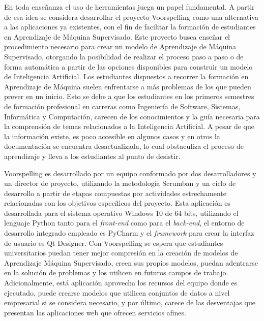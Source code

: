 En toda enseñanza el uso de herramientas juega un papel fundamental. A partir de esa idea se considera desarrollar el proyecto Voorspelling como una alternativa a las aplicaciones ya existentes, con el fin de facilitar la formación de estudiantes en Aprendizaje de Máquina Supervisado. Este proyecto busca enseñar el procedimiento necesario para crear un modelo de Aprendizaje de Máquina Supervisado, otorgando la posibilidad de realizar el proceso paso a paso o de forma automática a partir de las opciones disponibles para construir un modelo de Inteligencia Artificial. Los estudiantes dispuestos a recorrer la formación en Aprendizaje de Máquina suelen enfrentarse a más problemas de los que pueden prever en un inicio. Esto se debe a que los estudiantes en los primeros semestres de formación profesional en carreras como Ingeniería de Software, Sistemas, Informática y Computación, carecen de los conocimientos y la guía necesaria para la comprensión de temas relacionados a la Inteligencia Artificial. A pesar de que la información existe, es poco accesible en algunos casos y en otros la documentación se encuentra desactualizada, lo cual obstaculiza el proceso de aprendizaje y lleva a los estudiantes al punto de desistir.

Voorspelling es desarrollado por un equipo conformado por dos desarrolladores y un director de proyecto, utilizando la metodología Scrumban y un ciclo de desarrollo a partir de etapas compuestas por actividades estrechamente relacionadas con los objetivos específicos del proyecto. Esta aplicación es desarrollada para el sistema operativo Windows 10 de 64 bits, utilizando el lenguaje Python tanto para el \textit{front-end} como para el \textit{back-end}, el entorno de desarrollo integrado empleado es PyCharm y el \textit{framework} para crear la interfaz de usuario es Qt Designer. Con Voorspelling se espera que estudiantes universitarios puedan tener mejor compresión en la creación de modelos de Aprendizaje Máquina Supervisado, creen sus propios modelos, puedan adentrarse en la solución de problemas y los utilicen en futuros campos de trabajo. Adicionalmente, está aplicación aprovecha los recursos del equipo donde es ejecutado, puede crearse modelos que utilicen conjuntos de datos a nivel empresarial si se considera necesario, y por último, carece de las desventajas que presentan las aplicaciones web que ofrecen servicios afines.
